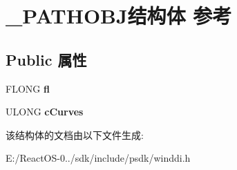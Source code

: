 \hypertarget{struct___p_a_t_h_o_b_j}{}\section{\+\_\+\+P\+A\+T\+H\+O\+B\+J结构体 参考}
\label{struct___p_a_t_h_o_b_j}
\subsection*{Public 属性}
\begin{DoxyCompactItemize}
\item 
\mbox{\label{struct___p_a_t_h_o_b_j_a3b1905cf6305ab86c55c767846021a56}} 
F\+L\+O\+NG {\bfseries fl}
\item 
\mbox{\label{struct___p_a_t_h_o_b_j_abd2158c41e34aa900809dab09bca0072}} 
U\+L\+O\+NG {\bfseries c\+Curves}
\end{DoxyCompactItemize}


该结构体的文档由以下文件生成\+:\begin{DoxyCompactItemize}
\item 
E\+:/\+React\+O\+S-\/0../sdk/include/psdk/winddi.\+h\end{DoxyCompactItemize}

